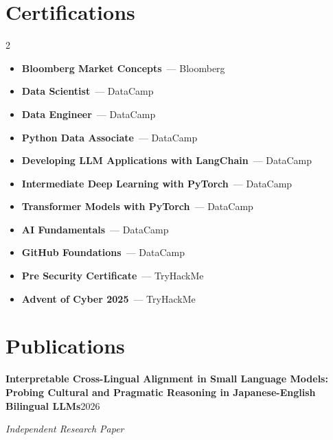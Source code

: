 \section{Certifications}

\begin{multicols}{2}
\begin{itemize}[leftmargin=15pt, itemsep=2pt, parsep=1pt, topsep=2pt]
    \bodysize
    \item \textbf{Bloomberg Market Concepts} \,{\color{subtle}--- Bloomberg}
    \item \textbf{Data Scientist} \,{\color{subtle}--- DataCamp}
    \item \textbf{Data Engineer} \,{\color{subtle}--- DataCamp}
    \item \textbf{Python Data Associate} \,{\color{subtle}--- DataCamp}
    \item \textbf{Developing LLM Applications with LangChain} \,{\color{subtle}--- DataCamp}
    \item \textbf{Intermediate Deep Learning with PyTorch} \,{\color{subtle}--- DataCamp}
    \item \textbf{Transformer Models with PyTorch} \,{\color{subtle}--- DataCamp}
    \item \textbf{AI Fundamentals} \,{\color{subtle}--- DataCamp}
    \item \textbf{GitHub Foundations} \,{\color{subtle}--- DataCamp}
    \item \textbf{Pre Security Certificate} \,{\color{subtle}--- TryHackMe}
    \item \textbf{Advent of Cyber 2025} \,{\color{subtle}--- TryHackMe}
\end{itemize}
\end{multicols}

\section{Publications}

{\bodysize\textbf{Interpretable Cross-Lingual Alignment in Small Language Models: Probing Cultural and Pragmatic Reasoning in Japanese-English Bilingual LLMs}\hfill{\smallsize\color{subtle}2026}}\par
\vspace{1pt}
{\bodysize\color{subtle}\textit{Independent Research Paper}}

